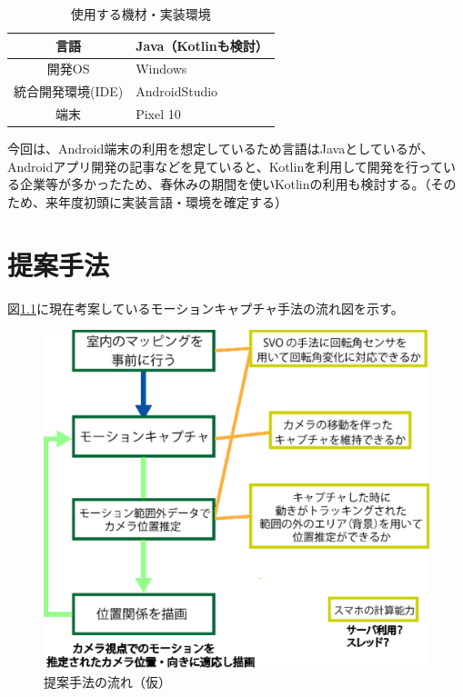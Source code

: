 \documentclass[11pt]{jreport}
\begin{document}
\begin{center}
\begin{table}[H]
\caption{使用する機材・実装環境}
\label{jikkoukannkyou}
\center
\begin{tabular}{|c||l|} \hline
言語 & Java（Kotlinも検討） \\ \hline 
開発OS & Windows  \\ \hline
統合開発環境(IDE) & AndroidStudio \\ \hline
端末 & Pixel 10 \\ \hline
\end{tabular}
\end{table}
\end{center}

今回は、Android端末の利用を想定しているため言語はJavaとしているが、Androidアプリ開発の記事などを見ていると、Kotlinを利用して開発を行っている企業等が多かったため、春休みの期間を使いKotlinの利用も検討する。（そのため、来年度初頭に実装言語・環境を確定する）

\chapter{提案手法}\label{chap:fig-tab-exp}
図\ref{method-fig}に現在考案しているモーションキャプチャ手法の流れ図を示す。

\begin{figure}[htbp]
  \centering
  \includegraphics[scale = 0.5]{memo1.eps}
  \caption{提案手法の流れ（仮）}
  \label{method-fig}
\end{figure}
\end{document}
